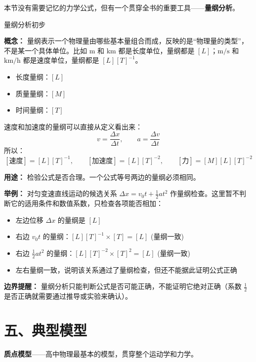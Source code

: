 本节没有需要记忆的力学公式，但有一个贯穿全书的重要工具——\textbf{量纲分析}。

\begin{conceptbox}{量纲分析初步}

\textbf{概念：} 量纲表示一个物理量由哪些基本量组合而成，反映的是“物理量的类型”，不是某一个具体单位。比如 $\mathrm{m}$ 和 $\mathrm{km}$ 都是长度单位，量纲都是 $[L]$；$\mathrm{m/s}$ 和 $\mathrm{km/h}$ 都是速度单位，量纲都是 $[L][T]^{-1}$。

\begin{itemize}
  \item 长度量纲：$[L]$
  \item 质量量纲：$[M]$
  \item 时间量纲：$[T]$
\end{itemize}

速度和加速度的量纲可以直接从定义看出来：
\[
v=\frac{\Delta x}{\Delta t},\qquad a=\frac{\Delta v}{\Delta t}
\]
所以：
\[
[\text{速度}] = [L][T]^{-1},\qquad
[\text{加速度}] = [L][T]^{-2},\qquad
[\text{力}] = [M][L][T]^{-2}
\]

\textbf{用途：} 检验公式是否合理。一个公式等号两边的量纲必须相同。

\textbf{举例：} 对匀变速直线运动的候选关系
$\Delta x = v_0 t + \frac{1}{2} a t^2$ 作量纲检查。这里暂不判断它的适用条件和数值系数，只检查各项能否相加：
\begin{itemize}
  \item 左边位移 $\Delta x$ 的量纲是 $[L]$
  \item 右边 $v_0 t$ 的量纲：$[L][T]^{-1} \times [T] = [L]$ \quad (量纲一致)
  \item 右边 $\frac{1}{2} a t^2$ 的量纲：$[L][T]^{-2} \times [T]^2 = [L]$ \quad (量纲一致)
  \item 左右量纲一致，说明该关系通过了量纲检查，但还不能据此证明公式正确
\end{itemize}

\textbf{边界提醒：} 量纲分析只能判断公式是否可能正确，不能证明它绝对正确（系数 $\frac{1}{2}$ 是否正确就需要通过推导或实验来确认）。

\end{conceptbox}

\section*{五、典型模型}

\textbf{质点模型}——高中物理最基本的模型，贯穿整个运动学和力学。

